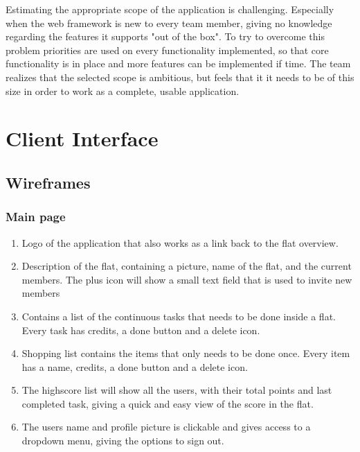 \documentclass{sig-alt-release2}
\begin{document}
Estimating the appropriate scope of the application is challenging. Especially
when the web framework is new to every team member, giving no knowledge
regarding the features it supports "out of the box". To try to overcome this
problem priorities are used on every functionality implemented, so that core
functionality is in place and more features can be implemented if time. The team
realizes that the selected scope is ambitious, but feels that it it needs to be
of this size in order to work as a complete, usable application.

\section{Client Interface}

\subsection{Wireframes}

\subsubsection{Main page}
\begin{enumerate}
\item Logo of the application that also works as a link back to the flat overview. 
\item Description of the flat, containing a picture, name of the flat, and the current members. The plus icon will show a small text field that is used to invite new members
\item Contains a list of the continuous tasks that needs to be done inside a flat. Every task has credits, a done button and a delete icon. 
\item Shopping list contains the items that only needs to be done once. Every item has a name, credits, a done button and a delete icon. 
\item The highscore list will show all the users, with their total points and last completed task, giving a quick and easy view of the score in the flat. 
\item The users name and profile picture is clickable and gives access to a dropdown menu, giving the options to sign out. 
\end{enumerate}
\end{document}
